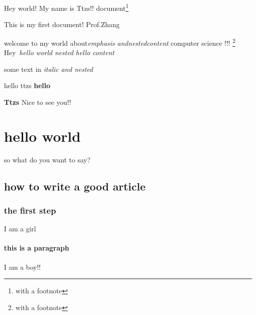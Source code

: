 \documentclass{article}
\begin{document}
Hey world!
My name is Ttzs!!
document\footnote{with a footnote}

This is my first document!
Prof.Zhang

welcome to my world about\emph{emphasis and\emph{nested}content} computer science !!! \footnote{with a footnote}
~
~
Hey~\emph{hello world \emph{nested\emph{   hello}} content}

some text in \textit{italic and \textit{nested}}

hello ttzs \textbf{hello}

\textbf{Ttzs} Nice to see you!!

\section{hello world}
so what do you want to say?
\subsection{how to write a good article}
\subsubsection{the first step}
I am a girl 
\paragraph{this is a paragraph} I am a boy!!
\end{document}
